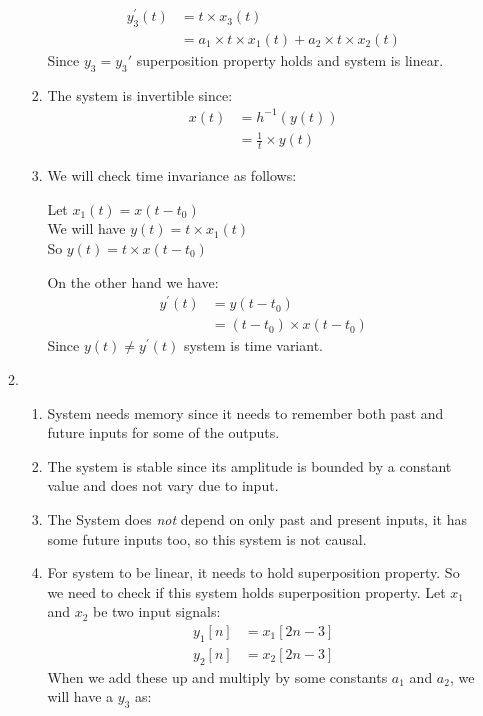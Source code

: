 \documentclass[10pt,a4paper, margin=1in]{article}
\begin{document}
\begin{enumerate}
\begin{enumerate}
\begin{enumerate}
\begin{align*}
                y_3^{'}(t)&=t \times x_3(t)\\
                &=a_1\times t \times x_1(t) + a_2\times t \times x_2(t)
            \end{align*}
            Since $y_3 = y_3'$ superposition property holds and system is linear.
        \item The system is invertible since:
        \begin{align*}
        x(t) &= h^{-1}(y(t)) \\
             &= \frac{1}{t} \times y(t)
        \end{align*}
        \item We will check time invariance as follows:
        \begin{center}
        Let $x_1(t) = x(t-t_0)$ \\
        We will have $y(t)=t \times x_1(t)$ \\
        So $y(t) = t \times x(t - t_0)$
        \end{center}
        On the other hand we have:
        \begin{align*}
        y^{'}(t) &= y(t-t_0) \\
        &= (t - t_0) \times x(t-t_0)
        \end{align*}
        Since $y(t) \neq y^{'}(t)$ system is time variant. \\
        \end{enumerate}
    \item 
        \begin{enumerate}
        \item System needs memory since it needs to remember both past and future inputs for some of the outputs.
        \item The system is stable since its amplitude is bounded by a constant value and does not vary due to input.
        \item The System does \textit{not} depend on only past and present inputs, it has some future inputs too, so this system is not causal.
        \item For system to be linear, it needs to hold superposition property. So we need to check if this system holds superposition property. Let $x_1$ and $x_2$ be two input signals:
            \begin{align*}
            y_1[n] & =x_1[2n-3] \\
            y_2[n] & =x_2[2n-3]
            \end{align*}
            When we add these up and multiply by some constants $a_1$ and $a_2$, we will have a $y_3$ as:

\end{enumerate}
\end{enumerate}
\end{enumerate}
\end{document}
